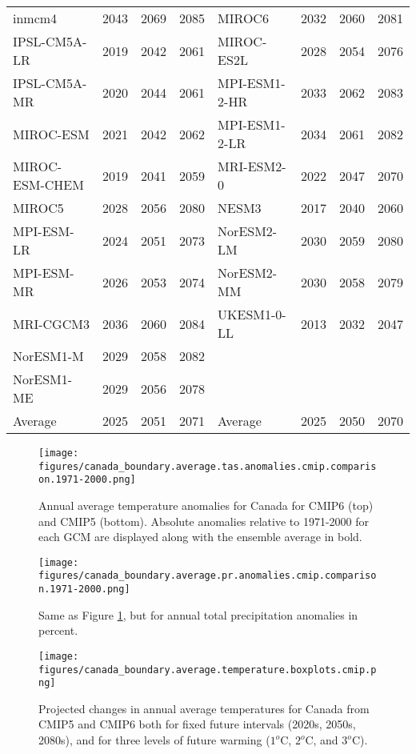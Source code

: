 \documentclass[]{scrartcl}
\begin{document}
\begin{table}[ht!]
\begin{center}
\begin{tabular}{|l|c|c|c|l|c|c|c|}
			inmcm4 & 2043 & 2069 & 2085 & MIROC6 & 2032 & 2060 & 2081 \\ 
			IPSL-CM5A-LR & 2019 & 2042 & 2061 & MIROC-ES2L & 2028 & 2054 & 2076 \\ 
			IPSL-CM5A-MR & 2020 & 2044 & 2061 & MPI-ESM1-2-HR & 2033 & 2062 & 2083 \\ 
			MIROC-ESM & 2021 & 2042 & 2062 & MPI-ESM1-2-LR & 2034 & 2061 & 2082 \\ 
			MIROC-ESM-CHEM & 2019 & 2041 & 2059 & MRI-ESM2-0 & 2022 & 2047 & 2070 \\ 
			MIROC5 & 2028 & 2056 & 2080 & NESM3 & 2017 & 2040 & 2060 \\ 
			MPI-ESM-LR & 2024 & 2051 & 2073 & NorESM2-LM & 2030 & 2059 & 2080 \\ 
			MPI-ESM-MR & 2026 & 2053 & 2074 & NorESM2-MM & 2030 & 2058 & 2079 \\ 
			MRI-CGCM3 & 2036 & 2060 & 2084 & UKESM1-0-LL & 2013 & 2032 & 2047 \\ 
			NorESM1-M & 2029 & 2058 & 2082 &  &  &  &  \\ 
			NorESM1-ME & 2029 & 2056 & 2078 &  &  &  &  \\ 
			Average & 2025 & 2051 & 2071 & Average & 2025 & 2050 & 2070 \\
			\hline
		\end{tabular}
	\end{center}
\end{table}	

\begin{figure}[ht!]
	\centering
	\texttt{[image: figures/canada\_boundary.average.tas.anomalies.cmip.comparison.1971-2000.png]}
	\caption[TAS]{Annual average temperature anomalies for Canada for CMIP6 (top) and CMIP5 (bottom). Absolute anomalies relative to 1971-2000 for each GCM are displayed along with the ensemble average in bold.}
	\label{fig:time_series_tas}
\end{figure}

\begin{figure}[ht!]
	\centering
	\texttt{[image: figures/canada\_boundary.average.pr.anomalies.cmip.comparison.1971-2000.png]}
	\caption[Pr]{Same as Figure \ref{fig:time_series_tas}, but for annual total precipitation anomalies in percent.}
	\label{fig:time_series_pr}
\end{figure}

\begin{figure}[ht!]
	\centering
	\texttt{[image: figures/canada\_boundary.average.temperature.boxplots.cmip.png]}
	\caption[Tas]{Projected changes in annual average temperatures for Canada from CMIP5 and CMIP6 both for fixed future intervals (2020s, 2050s, 2080s), and for three levels of future warming ($1^o$C, $2^o$C, and $3^o$C). }
	\label{fig:tas_boxplots}
\end{figure}
\end{document}
